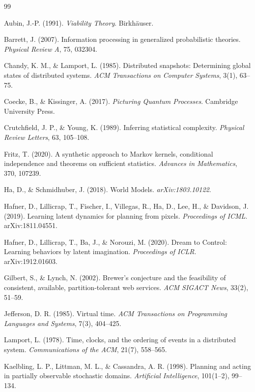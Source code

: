 \documentclass[11pt]{article}
\begin{document}
\begin{thebibliography}{99}

 Aubin, J.-P. (1991). \textit{Viability Theory}. Birkh\"auser.

 Barrett, J. (2007). Information processing in generalized probabilistic theories. \textit{Physical Review A}, 75, 032304.

 Chandy, K. M., \& Lamport, L. (1985). Distributed snapshots: Determining global states of distributed systems. \textit{ACM Transactions on Computer Systems}, 3(1), 63--75.

 Coecke, B., \& Kissinger, A. (2017). \textit{Picturing Quantum Processes}. Cambridge University Press.

 Crutchfield, J. P., \& Young, K. (1989). Inferring statistical complexity. \textit{Physical Review Letters}, 63, 105--108.

 Fritz, T. (2020). A synthetic approach to Markov kernels, conditional independence and theorems on sufficient statistics. \textit{Advances in Mathematics}, 370, 107239.

 Ha, D., \& Schmidhuber, J. (2018). World Models. \textit{arXiv:1803.10122}.

 Hafner, D., Lillicrap, T., Fischer, I., Villegas, R., Ha, D., Lee, H., \& Davidson, J. (2019). Learning latent dynamics for planning from pixels. \textit{Proceedings of ICML}. arXiv:1811.04551.

 Hafner, D., Lillicrap, T., Ba, J., \& Norouzi, M. (2020). Dream to Control: Learning behaviors by latent imagination. \textit{Proceedings of ICLR}. arXiv:1912.01603.

 Gilbert, S., \& Lynch, N. (2002). Brewer's conjecture and the feasibility of consistent, available, partition-tolerant web services. \textit{ACM SIGACT News}, 33(2), 51--59.

 Jefferson, D. R. (1985). Virtual time. \textit{ACM Transactions on Programming Languages and Systems}, 7(3), 404--425.

 Lamport, L. (1978). Time, clocks, and the ordering of events in a distributed system. \textit{Communications of the ACM}, 21(7), 558--565.

 Kaelbling, L. P., Littman, M. L., \& Cassandra, A. R. (1998). Planning and acting in partially observable stochastic domains. \textit{Artificial Intelligence}, 101(1--2), 99--134.


\end{thebibliography}
\end{document}
